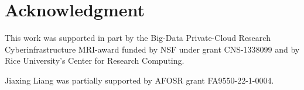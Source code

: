 \section{Acknowledgment}\label{sec:Acknowledgment}



This work was supported in part by the Big-Data Private-Cloud Research Cyberinfrastructure MRI-award funded by NSF under grant CNS-1338099 and by Rice University's Center for Research Computing.

Jiaxing Liang was partially supported by AFOSR grant FA9550-22-1-0004. 